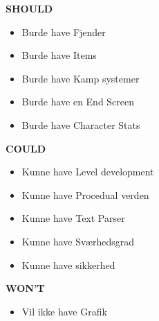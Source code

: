 \textbf{SHOULD}
\begin{itemize}
  \item Burde have Fjender
  \item Burde have Items
  \item Burde have Kamp systemer
  \item Burde have en End Screen
  \item Burde have Character Stats
\end{itemize}

\textbf{COULD}

\begin{itemize}
  \item Kunne have Level development
  \item Kunne have Procedual verden
  \item Kunne have Text Parser
  \item Kunne have Sværhedsgrad
  \item Kunne have sikkerhed
\end{itemize}

\textbf{WON'T}
\begin{itemize}
  \item Vil ikke have Grafik
\end{itemize}

 

